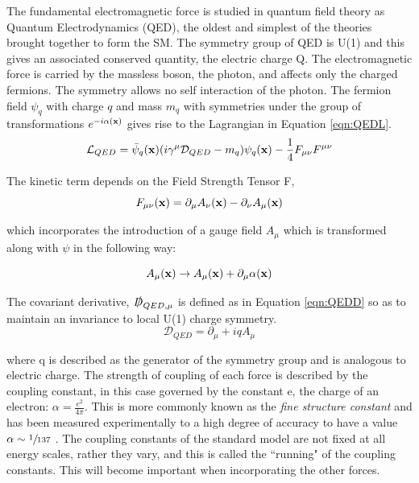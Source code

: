 The fundamental electromagnetic force is studied in quantum field theory as Quantum Electrodynamics (QED), the oldest and simplest of the theories brought together to form the SM. The symmetry group of QED is U(1) and this gives an associated conserved quantity, the electric charge Q. The electromagnetic force is carried by the massless boson, the photon, and affects only the charged fermions. The symmetry allows no self interaction of the photon. The fermion field $\psi_{q}$ with charge $q$ and mass $m_{q}$ with symmetries under the group of transformations $e^{-i\alpha(\mathbf{x})}$ gives rise to the Lagrangian in Equation \ref{eqn:QEDL}.
\begin{equation}
{\mathcal{L}}_{QED} = \bar{\psi}_{q}(\mathbf{x})(i \gamma^{\mu}\mathcal{D}_{QED} - m_{q}) \psi_{q}(\mathbf{x}) - \frac{1}{4}F_{\mu \nu}F^{\mu \nu}
\label{eqn:QEDL}
\end{equation}

The kinetic term depends on the Field Strength Tensor F, 
\begin{equation}
F_{\mu \nu} (\mathbf{x}) = \partial_{\mu} A_{\nu}(\mathbf{x}) -   \partial_{\nu} A_{\mu}(\mathbf{x}) 
\end{equation}

which incorporates the introduction of a gauge field $A_{\mu}$ which is transformed along with $\psi$ in the following way:

\begin{equation}
A_{\mu}(\mathbf{x}) \rightarrow A_{\mu}(\mathbf{x}) + \partial_{\mu} \alpha(\mathbf{x})
\label{AQED}
\end{equation}

The  covariant derivative, $\slashed{D}_{QED,\mu}$ is defined as in Equation \ref{eqn:QEDD} so as to maintain an invariance to local U(1) charge symmetry. 
\begin{equation}
\mathcal{D}_{QED} = \partial_{\mu} + iqA_{\mu}
\label{eqn:QEDD}
\end{equation}


where q is described as the generator of the symmetry group and is analogous to electric charge. The strength of coupling of each force is described by the coupling constant, in this case governed by the constant e, the charge of an electron: $\alpha = \frac{e^{2}}{4\pi}$. This is more commonly known as the \textit{fine structure constant} and has been measured experimentally to a high degree of accuracy to have a value $\alpha \sim \sfrac{1}{137}$ \cite{qedalpha}. The coupling constants of the standard model are not fixed at all energy scales, rather they vary, and this is called the ``running" of the coupling constants. This will become important when incorporating the other forces. 

